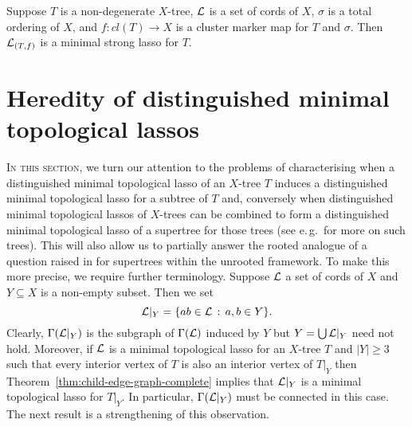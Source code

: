 \begin{cor}
  \label{corollary:strong-lasso-characterization}
  Suppose $T$ is a non-degenerate $X$-tree, ${\mathcal L}$ is a set of cords of $X$,
  $\sigma$ is a total ordering of $X$, and $f:cl(T)\to X$ is a cluster marker
  map for $T$ and $\sigma$.  Then ${\mathcal L}_{(T,f)}$ is a minimal strong lasso for
  $T$.
\end{cor}

\section{Heredity of distinguished minimal topological lassos}
\label{sec:subtree}

\textsc{In this section}, we turn our attention to the problems of
characterising when a distinguished minimal topological lasso of an $X$-tree
$T$ induces a distinguished minimal topological lasso for a subtree of $T$
and, conversely when distinguished minimal topological lassos of $X$-trees can
be combined to form a distinguished minimal topological lasso of a supertree
for those trees (see e.\,g.\,\cite{bininda04phylogenetic} for more on such
trees). This will also allow us to partially answer the rooted analogue of a
question raised in \cite{dress11lassoing} for supertrees within the unrooted
framework.  To make this more precise, we require further terminology.
Suppose ${\mathcal L}$ a set of cords of $X$ and $Y\subseteq X$ is a non-empty
subset. Then we set
$$
{\mathcal L}|_Y=\{ab\in{\mathcal L}\,:\, a,b\in Y\}.
$$
Clearly, $\Gamma({\mathcal L}|_Y)$ is the subgraph of $\Gamma({\mathcal L})$ induced by $Y$ but
$Y=\bigcup {\mathcal L}|_Y$ need not hold. Moreover, if ${\mathcal L}$ is a minimal topological
lasso for an $X$-tree $T$ and $|Y|\geq 3$ such that every interior vertex of
$T$ is also an interior vertex of $T|_Y$ then
Theorem~\ref{thm:child-edge-graph-complete} implies that ${\mathcal L}|_Y$ is a
minimal topological lasso for $T|_Y$. In particular, $\Gamma({\mathcal L}|_Y)$ must be
connected in this case.  The next result is a strengthening of this
observation.

